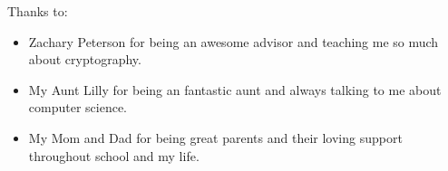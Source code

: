 \noindent
Thanks to:
\begin{itemize}
    \item Zachary Peterson for being an awesome advisor and teaching me so much about cryptography.
    \item My Aunt Lilly for being an fantastic aunt and always talking to me about computer science.
    \item My Mom and Dad for being great parents and their loving support throughout school and my life.
\end{itemize}
